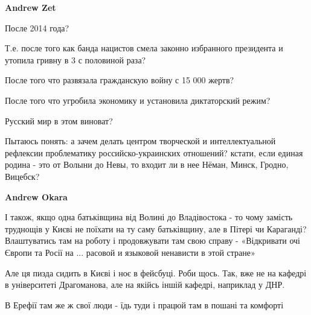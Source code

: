 \begin{itemize}
\begin{itemize}
 
\textbf{Andrew Zet} 

После 2014 года?

Т.е. после того как банда нацистов смела законно избранного президента и
утопила гривну в 3 с половиной раза?

После того что развязала гражданскую войну с 15 000 жертв?

После того что угробила экономику и установила диктаторский режим?

Русский мир в этом виноват?

\end{itemize}

 

Пытаюсь понять: а зачем делать центром творческой и интеллектуальной рефлексии
проблематику российско-украинских отношений? кстати, если единая родина - это
от Волыни до Невы, то входит ли в нее Нёман, Минск, Гродно, Вицебск?


\begin{itemize}
 
\textbf{Andrew Okara} 

І також, якщо одна батьківщина від Волині до Владівостока - то чому замість
труднощів у Києві не поїхати на ту саму батьківщину, але в Пітері чи Караганді?
Влаштуватись там на роботу і продовжувати там свою справу - «Відкривати очі
Європи та Росії на ... расовой и языковой ненависти в этой стране»

Але ця пизда сидить в Києві і ноє в фейсбуці. Роби щось. Так, вже не на кафедрі
в університеті Драгоманова, але на якійсь іншій кафедрі, наприклад у ДНР.

В Ерефії там же ж свої люди - їдь туди і працюй там в пошані та комфорті
\end{itemize}


\end{itemize}
